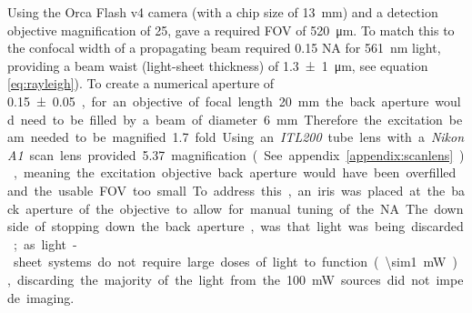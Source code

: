 

Using the Orca Flash v4 camera (with a chip size of \SI{13}{\milli\meter}) and a detection objective magnification of \SI{25}{\times}, gave a required \acrshort{FOV} of \SI{520}{\micro\meter}.
To match this to the confocal width of a propagating beam required 0.15 \acrshort{NA} for \SI{561}{\nano\meter} light, providing a beam waist (light-sheet thickness) of \SI{1.3 \pm 1}{\micro\meter}, see equation \ref{eq:rayleigh}).
To create a numerical aperture of \SI{0.15 \pm 0.05}, for an objective of focal length \SI{20}{\milli\meter} the back aperture would need to be filled by a beam of diameter \SI{6}{\milli\meter}.
Therefore the excitation beam needed to be magnified \SI{1.7}{} fold.

Using an \emph{ITL200} tube lens with a \emph{Nikon A1} scan lens provided \SI{5.37}{\times} magnification (See appendix \ref{appendix:scanlens}), meaning the excitation objective back aperture would have been overfilled and the usable \acrshort{FOV} too small.
To address this, an iris was placed at the back aperture of the objective to allow for manual tuning of the \acrshort{NA}.
The downside of stopping down the back aperture, was that light was being discarded; as light-sheet systems do not require large doses of light to function (\SI{\sim1}{\milli\watt}), discarding the majority of the light from the \SI{100}{\milli\watt} sources did not impede imaging.



